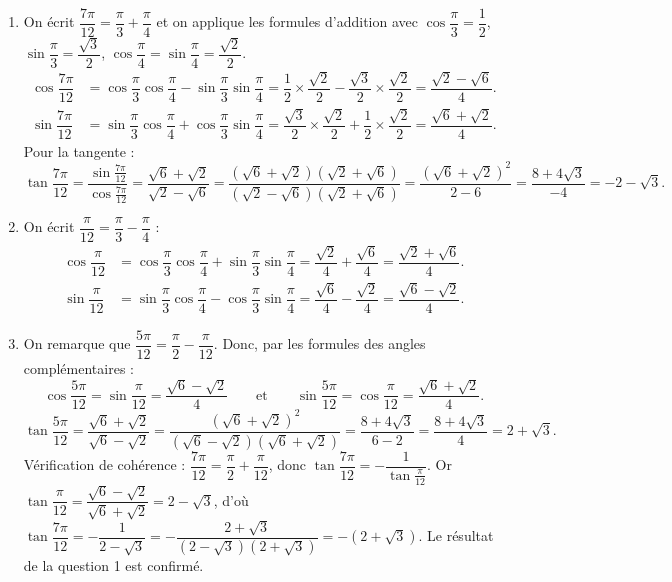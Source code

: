 \documentclass[11pt]{article}
\begin{document}
\begin{corrige}
\begin{enumerate}
\item On écrit $\dfrac{7\pi}{12}=\dfrac{\pi}{3}+\dfrac{\pi}{4}$ et on applique les formules d'addition avec $\cos\dfrac{\pi}{3}=\dfrac{1}{2}$, $\sin\dfrac{\pi}{3}=\dfrac{\sqrt{3}}{2}$, $\cos\dfrac{\pi}{4}=\sin\dfrac{\pi}{4}=\dfrac{\sqrt{2}}{2}$.
\begin{align*}
\cos\dfrac{7\pi}{12}&=\cos\dfrac{\pi}{3}\cos\dfrac{\pi}{4}-\sin\dfrac{\pi}{3}\sin\dfrac{\pi}{4}=\dfrac{1}{2}\times\dfrac{\sqrt{2}}{2}-\dfrac{\sqrt{3}}{2}\times\dfrac{\sqrt{2}}{2}=\dfrac{\sqrt{2}-\sqrt{6}}{4}.\\[2pt]
\sin\dfrac{7\pi}{12}&=\sin\dfrac{\pi}{3}\cos\dfrac{\pi}{4}+\cos\dfrac{\pi}{3}\sin\dfrac{\pi}{4}=\dfrac{\sqrt{3}}{2}\times\dfrac{\sqrt{2}}{2}+\dfrac{1}{2}\times\dfrac{\sqrt{2}}{2}=\dfrac{\sqrt{6}+\sqrt{2}}{4}.
\end{align*}
Pour la tangente :
\[\tan\dfrac{7\pi}{12}=\dfrac{\sin\frac{7\pi}{12}}{\cos\frac{7\pi}{12}}=\dfrac{\sqrt{6}+\sqrt{2}}{\sqrt{2}-\sqrt{6}}=\dfrac{(\sqrt{6}+\sqrt{2})(\sqrt{2}+\sqrt{6})}{(\sqrt{2}-\sqrt{6})(\sqrt{2}+\sqrt{6})}=\dfrac{(\sqrt{6}+\sqrt{2})^2}{2-6}=\dfrac{8+4\sqrt{3}}{-4}=-2-\sqrt{3}.\]
\item On écrit $\dfrac{\pi}{12}=\dfrac{\pi}{3}-\dfrac{\pi}{4}$ :
\begin{align*}
\cos\dfrac{\pi}{12}&=\cos\dfrac{\pi}{3}\cos\dfrac{\pi}{4}+\sin\dfrac{\pi}{3}\sin\dfrac{\pi}{4}=\dfrac{\sqrt{2}}{4}+\dfrac{\sqrt{6}}{4}=\dfrac{\sqrt{2}+\sqrt{6}}{4}.\\[2pt]
\sin\dfrac{\pi}{12}&=\sin\dfrac{\pi}{3}\cos\dfrac{\pi}{4}-\cos\dfrac{\pi}{3}\sin\dfrac{\pi}{4}=\dfrac{\sqrt{6}}{4}-\dfrac{\sqrt{2}}{4}=\dfrac{\sqrt{6}-\sqrt{2}}{4}.
\end{align*}
\item On remarque que $\dfrac{5\pi}{12}=\dfrac{\pi}{2}-\dfrac{\pi}{12}$. Donc, par les formules des angles complémentaires :
\[\cos\dfrac{5\pi}{12}=\sin\dfrac{\pi}{12}=\dfrac{\sqrt{6}-\sqrt{2}}{4}\qquad\text{et}\qquad \sin\dfrac{5\pi}{12}=\cos\dfrac{\pi}{12}=\dfrac{\sqrt{6}+\sqrt{2}}{4}.\]
\[\tan\dfrac{5\pi}{12}=\dfrac{\sqrt{6}+\sqrt{2}}{\sqrt{6}-\sqrt{2}}=\dfrac{(\sqrt{6}+\sqrt{2})^2}{(\sqrt{6}-\sqrt{2})(\sqrt{6}+\sqrt{2})}=\dfrac{8+4\sqrt{3}}{6-2}=\dfrac{8+4\sqrt{3}}{4}=2+\sqrt{3}.\]
Vérification de cohérence : $\dfrac{7\pi}{12}=\dfrac{\pi}{2}+\dfrac{\pi}{12}$, donc $\tan\dfrac{7\pi}{12}=-\dfrac{1}{\tan\frac{\pi}{12}}$. Or $\tan\dfrac{\pi}{12}=\dfrac{\sqrt{6}-\sqrt{2}}{\sqrt{6}+\sqrt{2}}=2-\sqrt{3}$, d'où $\tan\dfrac{7\pi}{12}=-\dfrac{1}{2-\sqrt{3}}=-\dfrac{2+\sqrt{3}}{(2-\sqrt{3})(2+\sqrt{3})}=-(2+\sqrt{3})$. Le résultat de la question 1 est confirmé.
\end{enumerate}
\end{corrige}
\end{document}
